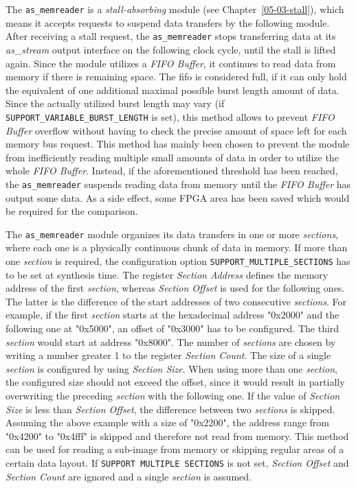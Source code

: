 The \texttt{as\_memreader} is a \textit{stall-absorbing} module (see Chapter~\ref{05-03-stall}), which means it accepts requests to suspend data transfers by the following module.
After receiving a stall request, the \texttt{as\_memreader} stops transferring data at its \textit{as\_stream} output interface on the following clock cycle, until the stall is lifted again.
Since the module utilizes a \textit{FIFO Buffer}, it continues to read data from memory if there is remaining space.
The fifo is considered full, if it can only hold the equivalent of one additional maximal possible burst length amount of data.
Since the actually utilized burst length may vary (if \texttt{SUPPORT\_VARIABLE\_BURST\_LENGTH} is set), this method allows to prevent \textit{FIFO Buffer} overflow without having to check the precise amount of space left for each memory bus request.
This method has mainly been chosen to prevent the module from inefficiently reading multiple small amounts of data in order to utilize the whole \textit{FIFO Buffer}.
Instead, if the aforementioned threshold has been reached, the \texttt{as\_memreader} suspends reading data from memory until the \textit{FIFO Buffer} has output some data.
As a side effect, some FPGA area has been saved which would be required for the comparison.


The \texttt{as\_memreader} module organizes its data transfers in one or more \textit{sections}, where each one is a physically continuous chunk of data in memory.
If more than one \textit{section} is required, the configuration option \texttt{SUPPORT\_MULTIPLE\_SECTIONS} has to be set at synthesis time.
The register \textit{Section Address} defines the memory address of the first \textit{section}, whereas \textit{Section Offset} is used for the following ones.
The latter is the difference of the start addresses of two consecutive \textit{sections}.
For example, if the first \textit{section} starts at the hexadecimal address "0x2000" and the following one at "0x5000", an offset of "0x3000" has to be configured.
The third \textit{section} would start at address "0x8000".
The number of \textit{sections} are chosen by writing a number greater 1 to the register \textit{Section Count}.
The size of a single \textit{section} is configured by using \textit{Section Size}.
When using more than one \textit{section}, the configured size should not exceed the offset, since it would result in partially overwriting the preceding \textit{section} with the following one.
If the value of \textit{Section Size} is less than \textit{Section Offset}, the difference between two \textit{sections} is skipped.
Assuming the above example with a size of "0x2200", the address range from "0x4200" to "0x4fff" is skipped and therefore not read from memory.
This method can be used for reading a sub-image from memory or skipping regular areas of a certain data layout.
If \texttt{SUPPORT\ MULTIPLE\ SECTIONS} is not set, \textit{Section Offset} and \textit{Section Count} are ignored and a single \textit{section} is assumed.


